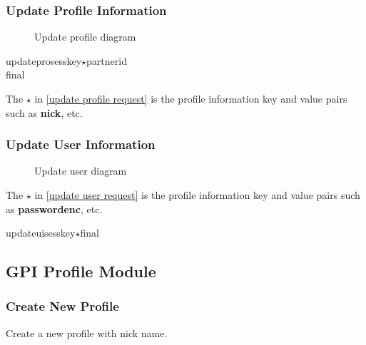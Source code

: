 \documentclass[oneside,titlepage,a4paper]{Definition/retrospy} %
\begin{document}
\subsubsection{Update Profile Information}
\begin{figure}[H]
	\centering
	\caption{Update profile diagram}
	\label{Update profile diagram}
\end{figure}
\ClientRequest

\begin{mybox}[label = update profile request]
	\tbs updatepro\tbs\tbs sesskey\tbs<session key>\tbs $\star$\tbs partnerid\tbs<partner id>\\\tbs final\tbs
\end{mybox}
The $\star$ in \ref{update profile request} is the profile information key and value pairs such as\textbf{ \tbs nick\tbs}, etc.
\subsubsection{Update User Information}
\begin{figure}[H]
	\centering
	\caption{Update user diagram}
	\label{Update user diagram}
\end{figure}
\ClientRequest
The $\star$ in \ref{update user request} is the profile information key and value pairs such as \textbf{\tbs passwordenc\tbs}, etc.
\begin{mybox}[label = update user request]
	\tbs updateui\tbs\tbs sesskey\tbs<session key>\tbs $\star$\tbs final\tbs
\end{mybox}



\subsection{GPI Profile Module}

\subsubsection{Create New Profile}
Create a new profile with nick name.
\ClientRequest
\end{document}

